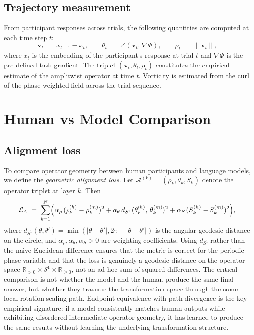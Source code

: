 \documentclass[12pt, a4paper]{article}
\theoremstyle{remark}
\theoremstyle{definition}
\newcommand{\vv}{\mathbf{v}}
\newcommand{\Phif}{\Phi}
\begin{document}
\subsection{Trajectory measurement}

From participant responses across trials, the following quantities are computed at each
time step $t$:
\begin{equation}
  \vv_t \;=\; x_{t+1} - x_t, \qquad
  \theta_t \;=\; \angle(\vv_t,\, \nabla\Phif), \qquad
  \rho_t \;=\; \|\vv_t\|,
  \label{eq:measures}
\end{equation}
where $x_t$ is the embedding of the participant's response at trial $t$ and $\nabla\Phif$
is the pre-defined task gradient.  The triplet $(\vv_t, \theta_t, \rho_t)$ constitutes the
empirical estimate of the amplitwist operator at time $t$.  Vorticity is estimated from the
curl of the phase-weighted field across the trial sequence.

\section{Human vs Model Comparison}
\label{sec:comparison}

\subsection{Alignment loss}

To compare operator geometry between human participants and language models, we define the
\emph{geometric alignment loss}.  Let $\mathcal{A}^{(k)} = (\rho_k, \theta_k, S_k)$ denote
the operator triplet at layer $k$.  Then
\begin{equation}
  \mathcal{L}_A \;=\; \sum_{k=1}^{N} \Bigl(
    \alpha_\rho\,(\rho_k^{(h)} - \rho_k^{(m)})^2
    + \alpha_\theta\,d_{S^1}(\theta_k^{(h)},\, \theta_k^{(m)})^2
    + \alpha_S\,(S_k^{(h)} - S_k^{(m)})^2
  \Bigr),
  \label{eq:alignloss}
\end{equation}
where $d_{S^1}(\theta, \theta') = \min(|\theta - \theta'|, 2\pi - |\theta - \theta'|)$ is
the angular geodesic distance on the circle, and $\alpha_\rho, \alpha_\theta, \alpha_S > 0$
are weighting coefficients.  Using $d_{S^1}$ rather than the naive Euclidean difference
ensures that the metric is correct for the periodic phase variable and that the loss is
genuinely a geodesic distance on the operator space $\mathbb{R}_{>0} \times S^1 \times
\mathbb{R}_{\ge 0}$, not an ad hoc sum of squared differences.
The critical comparison is not whether the model and the human produce the same final
answer, but whether they traverse the transformation space through the same local
rotation-scaling path.  Endpoint equivalence with path divergence is the key empirical
signature: if a model consistently matches human outputs while exhibiting disordered
intermediate operator geometry, it has learned to produce the same results without learning
the underlying transformation structure.
\end{document}
